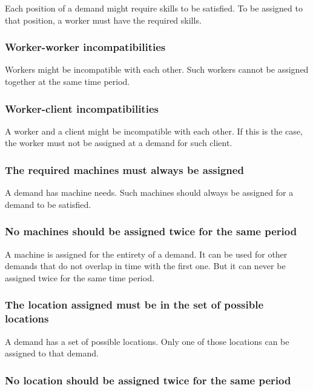 \documentclass[../thesis.tex]{subfiles}
\begin{document}
Each position of a demand might require skills to be satisfied. 
To be assigned to that position, a worker must have the required skills.

\subsubsection{Worker-worker incompatibilities}

Workers might be incompatible with each other. Such workers cannot
be assigned together at the same time period.

\subsubsection{Worker-client incompatibilities}

A worker and a client might be incompatible with each other. 
If this is the case, the worker must not be assigned at a demand for such client.

\subsubsection{The required machines must always be assigned}

A demand has machine needs. Such machines should always be assigned 
for a demand to be satisfied.

\subsubsection{No machines should be assigned twice for the same period}

A machine is assigned for the entirety of a demand. It can be used for other demands 
that do not overlap in time with the first one. But it can never be assigned twice 
for the same time period.

\subsubsection{The location assigned must be in the set of possible locations}

A demand has a set of possible locations. Only one of those locations can be assigned 
to that demand.

\subsubsection{No location should be assigned twice for the same period}
\end{document}
